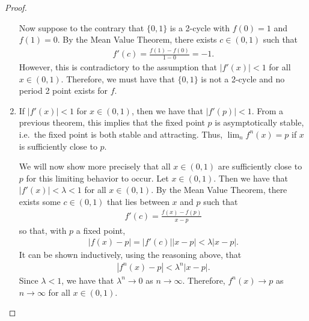 \begin{proof}
\begin{enumerate}
      Now suppose to the contrary that $\{0, 1\}$ is a 2-cycle with $f(0) = 1$ and $f(1) = 0$.
      By the Mean Value Theorem, there exists $c\in(0, 1)$ such that
      \begin{align*}
        f'(c) = \frac{f(1) - f(0)}{1 - 0} = -1.
      \end{align*}
      However, this is contradictory to the assumption that $|f'(x)| < 1$ for all $x\in (0,1)$.
      Therefore, we must have that $\{0, 1\}$ is not a 2-cycle and no period 2 point exists for $f$.
    \item If $|f'(x)| < 1$ for $x \in (0, 1)$, then we have that $|f'(p)| < 1$.
      From a previous theorem, this implies that the fixed point $p$ is asymptotically stable, i.e.\
      the fixed point is both stable and attracting. Thus, $\lim_n f^n(x) = p$ if $x$ is sufficiently close to $p$.

      We will now show more precisely that all $x\in (0, 1)$ are sufficiently close to $p$ for this limiting behavior to occur.
      Let $x\in(0, 1)$. Then we have that $|f'(x)| < \lambda < 1$ for all $x\in(0,1)$. By the Mean Value Theorem, there exists some $c \in (0, 1)$
      that lies between $x$ and $p$ such that
      \begin{align*}
        f'(c) = \frac{f(x) - f(p)}{x - p}
      \end{align*}
      so that, with $p$ a fixed point,
      \begin{align*}
        |f(x) - p| = |f'(c)||x-p| < \lambda |x-p|.
      \end{align*}
      It can be shown inductively, using the reasoning above, that
      \begin{align*}
        |f^n(x) - p| < \lambda^n |x-p|.
      \end{align*}
      Since $\lambda < 1$, we have that $\lambda^n \to 0$ as $n\to\infty$. Therefore, $f^n(x) \to p$ as $n\to\infty$
      for all $x\in(0,1)$.
  \end{enumerate}
\end{proof}
\newpage
